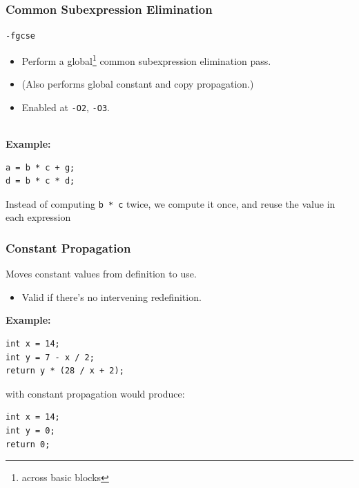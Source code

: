 \begin{frame}[fragile]
  \frametitle{Common Subexpression Elimination}

  

  {\tt -fgcse}

  \begin{itemize}
    \item Perform a global\footnote{across basic blocks} common subexpression elimination pass.
    \item (Also performs global constant and copy propagation.)
    \item Enabled at {\tt -O2}, {\tt -O3}.
  \end{itemize}
  ~\\[1em]

  {\bf Example:} 

  \begin{lstlisting}
a = b * c + g;
d = b * c * d;
  \end{lstlisting}

  Instead of computing {\tt b * c} twice, we compute it once, and reuse the
  value in each expression
  
\end{frame}

\begin{frame}[fragile]
  \frametitle{Constant Propagation}

  

  Moves constant values from definition to use.

  \begin{itemize}
    \item Valid if there's no intervening redefinition.
  \end{itemize}
  \vfill
  {\bf Example:}
  \begin{lstlisting}
int x = 14;
int y = 7 - x / 2;
return y * (28 / x + 2);
  \end{lstlisting}

  with constant propagation would produce:

  \begin{lstlisting}
int x = 14;
int y = 0;
return 0;
  \end{lstlisting}
  
\end{frame}

